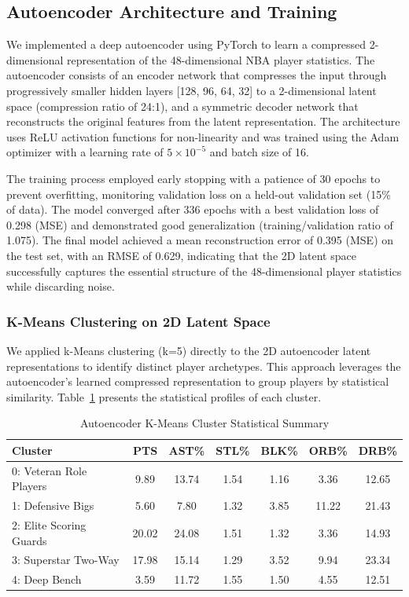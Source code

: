\documentclass{article}
\begin{document}
\subsection{Autoencoder Architecture and Training}

We implemented a deep autoencoder using PyTorch to learn a compressed 2-dimensional representation of the 48-dimensional NBA player statistics. The autoencoder consists of an encoder network that compresses the input through progressively smaller hidden layers [128, 96, 64, 32] to a 2-dimensional latent space (compression ratio of 24:1), and a symmetric decoder network that reconstructs the original features from the latent representation. The architecture uses ReLU activation functions for non-linearity and was trained using the Adam optimizer with a learning rate of $5 \times 10^{-5}$ and batch size of 16.

The training process employed early stopping with a patience of 30 epochs to prevent overfitting, monitoring validation loss on a held-out validation set (15\% of data). The model converged after 336 epochs with a best validation loss of 0.298 (MSE) and demonstrated good generalization (training/validation ratio of 1.075). The final model achieved a mean reconstruction error of 0.395 (MSE) on the test set, with an RMSE of 0.629, indicating that the 2D latent space successfully captures the essential structure of the 48-dimensional player statistics while discarding noise.

\subsubsection{K-Means Clustering on 2D Latent Space}

We applied k-Means clustering (k=5) directly to the 2D autoencoder latent representations to identify distinct player archetypes. This approach leverages the autoencoder's learned compressed representation to group players by statistical similarity. Table~\ref{tab:ae_cluster_stats} presents the statistical profiles of each cluster.

\begin{table}[h!]
\centering
\caption{Autoencoder K-Means Cluster Statistical Summary}
\label{tab:ae_cluster_stats}
\begin{tabular}{lcccccc}
\toprule
\textbf{Cluster} & \textbf{PTS} & \textbf{AST\%} & \textbf{STL\%} & \textbf{BLK\%} & \textbf{ORB\%} & \textbf{DRB\%} \\
\midrule
0: Veteran Role Players & 9.89 & 13.74 & 1.54 & 1.16 & 3.36 & 12.65 \\
1: Defensive Bigs & 5.60 & 7.80 & 1.32 & 3.85 & 11.22 & 21.43 \\
2: Elite Scoring Guards & 20.02 & 24.08 & 1.51 & 1.32 & 3.36 & 14.93 \\
3: Superstar Two-Way & 17.98 & 15.14 & 1.29 & 3.52 & 9.94 & 23.34 \\
4: Deep Bench & 3.59 & 11.72 & 1.55 & 1.50 & 4.55 & 12.51 \\
\bottomrule
\end{tabular}
\end{table}
\end{document}
